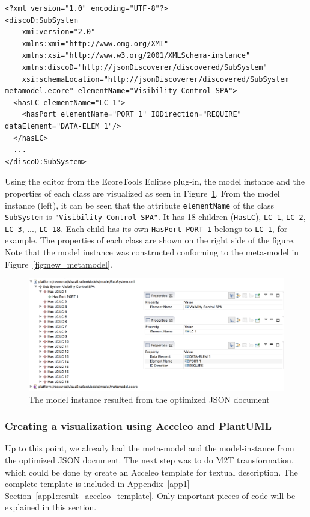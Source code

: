 \begin{lstlisting}[caption=Data model or model instance discovered by JSON discoverer,label=code:model_instance_xmi]
<?xml version="1.0" encoding="UTF-8"?>
<discoD:SubSystem
    xmi:version="2.0"
    xmlns:xmi="http://www.omg.org/XMI"
    xmlns:xsi="http://www.w3.org/2001/XMLSchema-instance"
    xmlns:discoD="http://jsonDiscoverer/discovered/SubSystem"
    xsi:schemaLocation="http://jsonDiscoverer/discovered/SubSystem metamodel.ecore" elementName="Visibility Control SPA">
  <hasLC elementName="LC 1">
    <hasPort elementName="PORT 1" IODirection="REQUIRE" dataElement="DATA-ELEM 1"/>
  </hasLC>
  ...
</discoD:SubSystem>
\end{lstlisting}

Using the editor from the EcoreTools Eclipse plug-in, the model instance and the properties of each class are visualized as seen in Figure~\ref{fig:new_model_instance}. From the model instance (left), it can be seen that the attribute \texttt{elementName} of the class \texttt{SubSystem} is \texttt{"Visibility Control SPA"}. It has 18 children (\texttt{HasLC}), \texttt{LC 1}, \texttt{LC 2}, \texttt{LC 3}, ..., \texttt{LC 18}. Each child has its own \texttt{HasPort}--\texttt{PORT 1} belongs to \texttt{LC 1}, for example. The properties of each class are shown on the right side of the figure. Note that the model instance was constructed conforming to the meta-model in Figure~\ref{fig:new_metamodel}.

\begin{figure}[H]
\centering
\captionsetup{justification=centering}
\vspace{0cm}%
\includegraphics[width=0.95\linewidth]{figure/new_model/new_model_instance.png}
\caption{The model instance resulted from the optimized JSON document}
\label{fig:new_model_instance}
\end{figure}

\subsubsection{Creating a visualization using Acceleo and PlantUML}
Up to this point, we already had the meta-model and the model-instance from the optimized JSON document. The next step was to do M2T transformation, which could be done by create an Acceleo template for textual description. The complete template is included in Appendix~\ref{app1} Section~\ref{app1:result_acceleo_template}. Only important pieces of code will be explained in this section.\\

